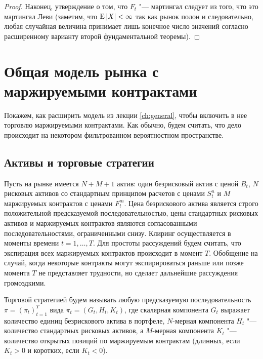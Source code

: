 \begin{proof}
Наконец, утверждение о том, что $F_t$ "--- мартингал следует из того, что это мартингал Леви (заметим, что $\operatorname{E}|X| < \infty$ так как рынок полон и следовательно, любая случайная величина принимает лишь конечное число значений согласно расширенному варианту второй фундаментальной теоремы).
\end{proof}


\section{Общая модель рынка с маржируемыми контрактами}

Покажем, как расширить модель из лекции \ref{ch:general}, чтобы включить в нее торговлю маржируемыми контрактами.
Как обычно, будем считать, что дело происходит на некотором фильтрованном вероятностном пространстве.

\subsection{Активы и торговые стратегии}
\label{fut:ss:assets}

Пусть на рынке имеется $N+M+1$ актив: один безрисковый актив с ценой $B_t$, $N$ рисковых активов со стандартным принципом расчетов с ценами $S_t^n$ и $M$ маржируемых контрактов с ценами $F_t^m$.
Цена безрискового актива является строго положительной предсказуемой последовательностью, цены стандартных рисковых активов и маржируемых контрактов являются согласованными последовательностями, ограниченными снизу. 
Клиринг осуществляется в моменты времени $t=1,\dots,T$.
Для простоты рассуждений будем считать, что экспирация всех маржируемых контрактов происходит в момент $T$.
Обобщение на случай, когда некоторые контракты могут экспирироваться раньше или позже момента $T$ не представляет трудности, но сделает дальнейшие рассуждения громоздкими. 

Торговой стратегией будем называть любую предсказуемую последовательность $\pi=(\pi_t)_{t=1}^T$ вида $\pi_t=(G_t,H_t,K_t)$, где скалярная компонента $G_t$ выражает количество единиц безрискового актива в портфеле, $N$-мерная компонента $H_t$ "--- количество стандартных рисковых активов, а $M$-мерная компонента $K_t$ "--- количество открытых позиций по маржируемым контрактам (длинных, если $K_t> 0$ и коротких, если $K_t<0$).

